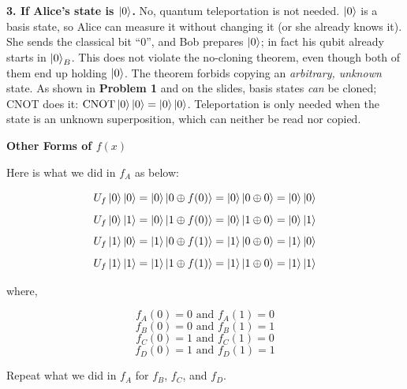\documentclass[a4paper, 10pt]{article}
\begin{document}
\begin{solution}
	\noindent \textbf{3. If Alice's state is \( \ket{0} \).} No, quantum teleportation is not needed. \( \ket{0} \) is a basis state, so Alice can measure it without changing it (or she already knows it). She sends the classical bit ``0'', and Bob prepares \( \ket{0} \); in fact his qubit already starts in \( \ket{0}_B \).
	This does not violate the no-cloning theorem, even though both of them end up holding \( \ket{0} \). The theorem forbids copying an \emph{arbitrary, unknown} state. As shown in \textbf{Problem 1} and on the slides, basis states \emph{can} be cloned; CNOT does it: \( \mathrm{CNOT}\ket{0}\ket{0} = \ket{0}\ket{0} \).
	Teleportation is only needed when the state is an unknown superposition, which can neither be read nor copied.
\end{solution}

\begin{problem}
\textbf{Other Forms of \( f(x) \)}
\par Here is what we did in \( f_A \) as below:

\[ U_f \ket{0}\ket{0} = \ket{0}\ket{0 \oplus f(0)} = \ket{0}\ket{0 \oplus 0} = \ket{0}\ket{0} \]
\[ U_f \ket{0}\ket{1} = \ket{0}\ket{1 \oplus f(0)} = \ket{0}\ket{1 \oplus 0} = \ket{0}\ket{1} \]
\[ U_f \ket{1}\ket{0} = \ket{1}\ket{0 \oplus f(1)} = \ket{1}\ket{0 \oplus 0} = \ket{1}\ket{0} \]
\[ U_f \ket{1}\ket{1} = \ket{1}\ket{1 \oplus f(1)} = \ket{1}\ket{1 \oplus 0} = \ket{1}\ket{1} \]

where,

\[ f_A(0) = 0 \text{ and } f_A(1) = 0 \]
\[ f_B(0) = 0 \text{ and } f_B(1) = 1 \]
\[ f_C(0) = 1 \text{ and } f_C(1) = 0 \]
\[ f_D(0) = 1 \text{ and } f_D(1) = 1 \]

Repeat what we did in \( f_A \) for \( f_B \), \( f_C \), and \( f_D \).
\end{problem}
\end{document}
